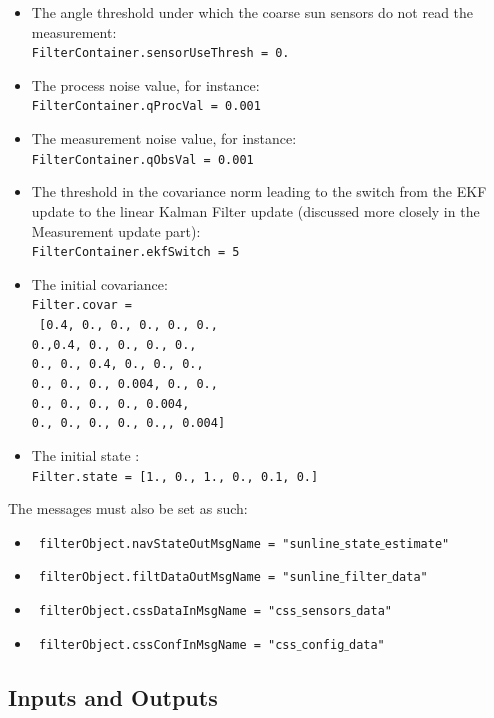 \documentclass[]{BasiliskReportMemo}
\begin{document}
\begin{itemize}
\item The angle threshold under which the coarse sun sensors do not read the measurement: \\ 
\texttt{FilterContainer.sensorUseThresh = 0.}
\item The process noise value, for instance:\\
 \texttt{FilterContainer.qProcVal = 0.001}
\item The measurement noise value, for instance: \\
 \texttt{FilterContainer.qObsVal = 0.001}
 \item The threshold in the covariance norm leading to the switch from the EKF update to the linear Kalman Filter update (discussed more closely in the Measurement update part):\\
 \texttt{FilterContainer.ekfSwitch = 5}
\item The initial covariance: \\
 \texttt{Filter.covar =} \\
  \texttt{ [0.4, 0., 0., 0., 0., 0., \\ 0.,0.4, 0., 0., 0., 0., \\ 0., 0., 0.4, 0., 0., 0.,\\ 0., 0., 0., 0.004, 0., 0., \\ 0., 0., 0., 0., 0.004, \\0., 0., 0., 0., 0.,, 0.004]}
 \item The initial state :\\
 \texttt{Filter.state = [1., 0., 1., 0., 0.1, 0.]}
\end{itemize}


The messages must also be set as such:

\begin{itemize}
\item    \texttt{ filterObject.navStateOutMsgName = "sunline$\_$state$\_$estimate"}
\item    \texttt{ filterObject.filtDataOutMsgName = "sunline$\_$filter$\_$data"}
\item   \texttt{ filterObject.cssDataInMsgName = "css$\_$sensors$\_$data"}
\item   \texttt{ filterObject.cssConfInMsgName = "css$\_$config$\_$data"}
\end{itemize}

\subsection{Inputs and Outputs}
\end{document}
